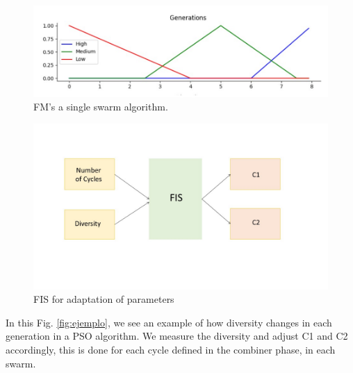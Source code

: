 \documentclass[runningheads]{llncs}
\begin{document}
\begin{figure} [htbp]
  \centering
  \includegraphics[angle=0,width=1\textwidth]{FM generation.pdf}
  \caption{FM's a single swarm algorithm.}
  \label{fig:generation} 
\end{figure}

\begin{figure}[htbp]
  \centering
  \includegraphics[angle=0,width=1\textwidth]{FIS.pdf}
  \caption{FIS for adaptation of parameters}
  \label{fig:fis} 
\end{figure}

In this Fig. \ref{fig:ejemplo}, we see an example of how diversity changes in each generation in a PSO algorithm. We measure the diversity and adjust C1 and C2 accordingly, this is done for each cycle defined in the combiner phase, in each swarm.
\end{document}
